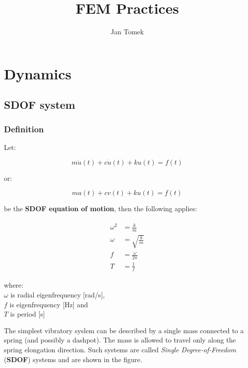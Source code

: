 \documentclass[10pt,b5paper,titlepage]{book}
\author{Jan Tomek}
\title{\bf FEM Practices}
\newenvironment{ematrix}
{
    \begin{eqnarray}
        \begin{aligned}
}
{
        \end{aligned}
    \end{eqnarray}
}
\begin{document}
\maketitle

\tableofcontents

\chapter{Dynamics}

\section{SDOF system}

\subsection{Definition}

Let:

\begin{equation}
    m \ddot{u}(t) + c \dot{u}(t) + k u(t) = f(t)
\end{equation}

or:

\begin{equation}
    m a(t) + c v(t) + k u(t) = f(t)
\end{equation}

be the \textbf{SDOF equation of motion}, then the following applies:

\begin{ematrix}
    \omega^2 &= \frac{k}{m} \\
    \omega &= \sqrt{\frac{k}{m}} \\
    f &= \frac{\omega}{2 \pi} \\
    T &= \frac{1}{f}
\end{ematrix}

where:\\
$ \omega $ is radial eigenfrequency [rad/s],\\
$ f $ is eigenfrequency [Hz] and\\
$ T $ is period [s]

The simplest vibratory syslem can be described by a single mass connected to a spring
(and possibly a dashpot). The mass is allowed to travel only along the spring elongation
direction. Such systems are called \textit{Single Degree-of-Freedom} (\textbf{SDOF})
systems and are shown in the figure.
\end{document}
